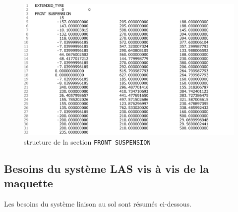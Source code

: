 \begin{figure}
    \centering
    \includegraphics[width=\linewidth]{fichiers/front suspension.pdf}
    \caption{structure de la section \texttt{FRONT SUSPENSION}}
    \label{fig:frontSuspension}
\end{figure}


\subsection{Besoins du système LAS vis à vis de la maquette} %

\par Les besoins du système liaison au sol sont résumés ci-dessous.\\


